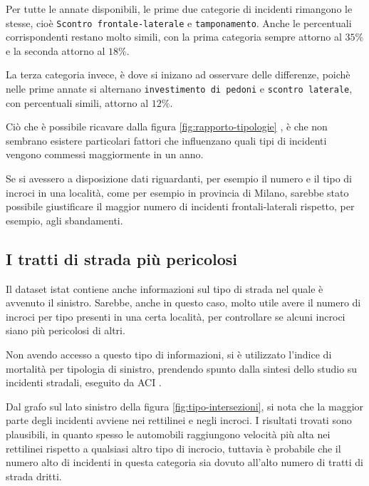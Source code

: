 \documentclass[a4paper]{report}
\newcommand{\columnstyle}[1]{\texttt{#1}}
\begin{document}
Per tutte le annate disponibili, le prime due categorie di incidenti rimangono le stesse, cioè 
\columnstyle{Scontro frontale-laterale} e \columnstyle{tamponamento}. Anche le percentuali 
corrispondenti restano molto simili, con la prima categoria sempre attorno al $35\%$ e 
la seconda attorno al $18\%$.

La terza categoria invece, è dove si inizano ad osservare delle differenze, poichè nelle 
prime annate si alternano \columnstyle{investimento di pedoni} e 
\columnstyle{scontro laterale}, con percentuali simili, attorno al $12\%$.

Ciò che è possibile ricavare dalla figura \ref{fig:rapporto-tipologie} , è che non 
sembrano esistere particolari fattori che influenzano quali tipi di incidenti vengono 
commessi maggiormente in un anno. 

Se si avessero a disposizione dati riguardanti, per esempio il numero e il tipo 
di incroci in una località, come per esempio in provincia di Milano, sarebbe stato possibile 
giustificare il maggior numero di incidenti frontali-laterali rispetto, per esempio, agli sbandamenti.

\subsection{I tratti di strada più pericolosi}

Il dataset istat contiene anche informazioni sul tipo di strada nel quale è avvenuto il 
sinistro.
Sarebbe, anche in questo caso, molto utile avere il numero di incroci per tipo presenti in una 
certa località, per controllare se alcuni incroci siano più pericolosi di altri.

Non avendo accesso a questo tipo di informazioni, si è utilizzato l'indice di mortalità per 
tipologia di sinistro, prendendo spunto dalla sintesi dello studio su incidenti stradali, 
eseguito da ACI \cite{ACI:2}.

Dal grafo sul lato sinistro della figura \ref{fig:tipo-intersezioni}, 
si nota che la maggior parte degli incidenti avviene nei rettilinei e negli incroci.
I risultati trovati sono plausibili, in quanto spesso le automobili raggiungono 
velocità più alta nei rettilinei rispetto a qualsiasi altro tipo di incrocio, tuttavia è probabile 
che il numero alto di incidenti in questa categoria sia dovuto all'alto numero di tratti di strada 
dritti.
\end{document}
